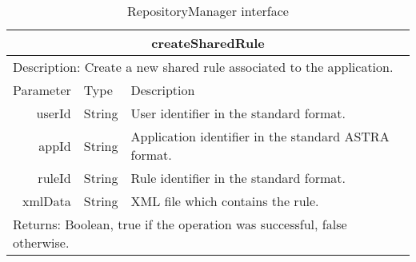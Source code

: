 \begin{table}[h!]
\begin{center}
\begin{tabular}{||r|l|l||}
		\hline \hline
		\multicolumn{3}{||c||}{\bfseries{createSharedRule}} \\
		\hline
		\hline 
		\multicolumn{3}{||l||}{Description: Create a new shared rule associated to
		the application.} \\ \hline \hline Parameter & Type & Description \\
		\hline \hline
			userId & String & User identifier in the standard format. \\
			appId & String & Application identifier in the standard ASTRA format. \\
			ruleId & String & Rule identifier in the standard format. \\
			xmlData & String & XML file which contains the rule. \\
		\hline \hline
		\multicolumn{3}{||l||}{Returns: Boolean, true if the operation was successful,
		false otherwise.} \\ \hline \hline
		
		\end{tabular}
		\caption{\label{table:rm-interface-1} RepositoryManager interface}
	\end{center}
\end{table}


